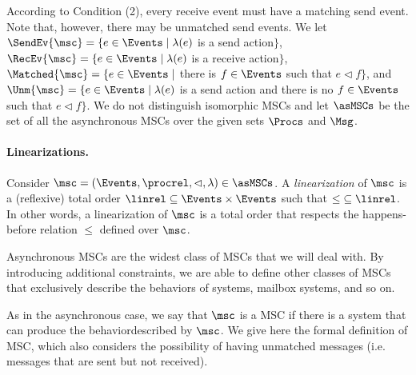 According to Condition (2), every receive event must have a matching send event. Note that, however, there may be unmatched send events.
We let
$\SendEv{\msc} = \{e \in \Events \mid \lambda(e)$ is a send
action$\}$,
$\RecEv{\msc} = \{e \in \Events \mid \lambda(e)$ is a receive
action$\}$,
$\Matched{\msc} = \{e \in \Events \mid$ there is $f \in \Events$
such that $e \lhd f\}$, and
$\Unm{\msc} = \{e \in \Events \mid \lambda(e)$ is a send
action and there is no $f \in \Events$ such that $e \lhd f\}$.
%
We do not distinguish isomorphic MSCs and
let $\asMSCs$ be the set of all the asynchronous MSCs over the given sets $\Procs$ and $\Msg$.



\paragraph*{Linearizations.}

Consider $\msc = (\Events,\procrel,\lhd,\lambda) \in \asMSCs$.
A \emph{linearization} of $\msc$ is a (reflexive) total order ${\linrel} \subseteq \Events \times \Events$ such that ${\le} \subseteq {\linrel}$. In other words, a linearization of $\msc$ is a total order that respects the happens-before relation $\le$ defined over $\msc$.

\medskip

Asynchronous MSCs are the widest class of MSCs that we will deal with. By introducing additional constraints, we are able to define other classes of MSCs that exclusively describe the behaviors of \pp systems, mailbox systems, and so on.

As in the asynchronous case, we say that $\msc$ is a \pp MSC if there is a \pp system that can produce the behaviordescribed by $\msc$. We give here the formal definition of \pp MSC, which also considers the possibility of having unmatched messages (i.e. messages that are sent but not received).

